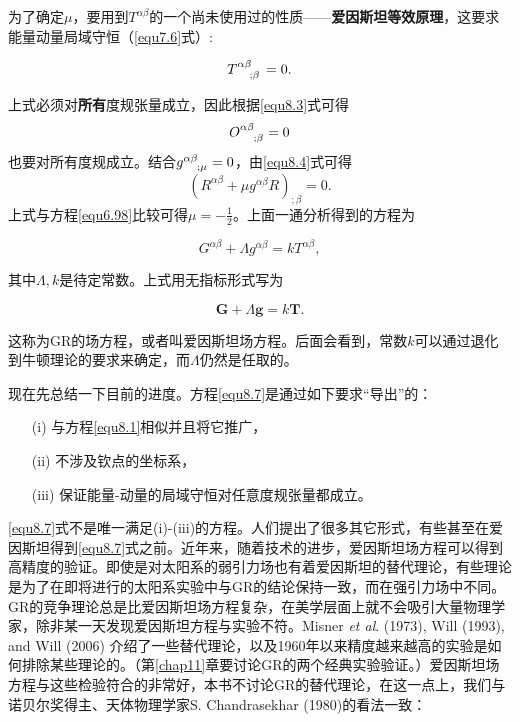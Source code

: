 为了确定$\mu$，要用到$T^{\alpha \beta}$的一个尚未使用过的性质——\textbf{爱因斯坦等效原理}，这要求能量动量局域守恒（\eqref{equ7.6}式）:
\begin{shaded}
\[
    T\indices{^{\alpha \beta}_{; \beta} } = 0.
\]
\end{shaded}
上式必须对\textbf{所有}度规张量成立，因此根据\eqref{equ8.3}式可得
\begin{equation}
    O\indices{^{\alpha \beta}_{; \beta} } = 0
\label{equ8.5}
\end{equation}
也要对所有度规成立。结合$g\indices{^{\alpha \beta}_{; \mu} } = 0$，由\eqref{equ8.4}式可得
\begin{equation}
    (R^{\alpha \beta} + \mu g^{\alpha \beta} R)_{; \beta} = 0.
\label{equ8.6}
\end{equation}
上式与方程\eqref{equ6.98}比较可得$\mu = -\frac{1}{2}$。上面一通分析得到的方程为
\begin{shaded}
\begin{equation}
    G^{\alpha \beta} + \Lambda g^{\alpha \beta} = kT^{\alpha \beta},
\label{equ8.7}
\end{equation}
\end{shaded}
其中$\Lambda, k$是待定常数。上式用无指标形式写为
\begin{shaded}
\begin{equation}
    \mathbf{G} + \Lambda \mathbf{g} = k \mathbf{T}.
\label{equ8.8}
\end{equation}
\end{shaded}
这称为GR的场方程，或者叫爱因斯坦场方程。后面会看到，常数$k$可以通过退化到牛顿理论的要求来确定，而$\Lambda$仍然是任取的。

现在先总结一下目前的进度。方程\eqref{equ8.7}是通过如下要求“导出”的：
\begin{enumerate}
    \item[(i)] 与方程\eqref{equ8.1}相似并且将它推广，
    \item[(ii)] 不涉及钦点的坐标系，
    \item[(iii)] 保证能量-动量的局域守恒对任意度规张量都成立。
\end{enumerate}
\eqref{equ8.7}式不是唯一满足(i)-(iii)的方程。人们提出了很多其它形式，有些甚至在爱因斯坦得到\eqref{equ8.7}式之前。近年来，随着技术的进步，爱因斯坦场方程可以得到高精度的验证。即使是对太阳系的弱引力场也有着爱因斯坦的替代理论，有些理论是为了在即将进行的太阳系实验中与GR的结论保持一致，而在强引力场中不同。GR的竞争理论总是比爱因斯坦场方程复杂，在美学层面上就不会吸引大量物理学家，除非某一天发现爱因斯坦方程与实验不符。Misner \textit{et al}. (1973), Will (1993), and Will (2006) 介绍了一些替代理论，以及1960年以来精度越来越高的实验是如何排除某些理论的。（第\ref{chap11}章要讨论GR的两个经典实验验证。）爱因斯坦场方程与这些检验符合的非常好，本书不讨论GR的替代理论，在这一点上，我们与诺贝尔奖得主、天体物理学家S. Chandrasekhar (1980)的看法一致：


